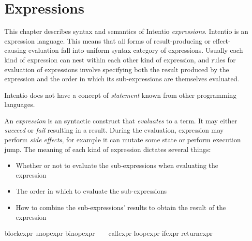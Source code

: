 \chapter{Expressions}

This chapter describes syntax and semantics of Intentio \emph{expressions}. Intentio is an expression language. This means that all forms of result-producing or effect-causing evaluation fall into uniform syntax category of expressions. Usually each kind of expression can nest within each other kind of expression, and rules for evaluation of expressions involve specifying both the result produced by the expression and the order in which its sub-expressions are themselves evaluated.

Intentio does not have a concept of \emph{statement} known from other programming languages.

An \emph{expression} is an syntactic construct that \emph{evaluates} to a term. It may either \emph{succeed} or \emph{fail} resulting in a result. During the evaluation, expression may perform \emph{side effects}, for example it can mutate some state or perform execution jump. The meaning of each kind of expression dictates several things:

\begin{itemize}
  \item Whether or not to evaluate the sub-expressions when evaluating the expression
  \item The order in which to evaluate the sub-expressions
  \item How to combine the sub-expressions' results to obtain the result of the expression
\end{itemize}

\begin{bnf}
   \eq    {}                   
            \gorln {}
            \gorln blockexpr                           
            \gorln unopexpr                            
            \gorln binopexpr                           
            \gorln \term{(} \  \ \term{)}     
            \gorln callexpr                            
            \gorln loopexpr                            
            \gorln ifexpr                              
            \gorln returnexpr                          
\end{bnf}
